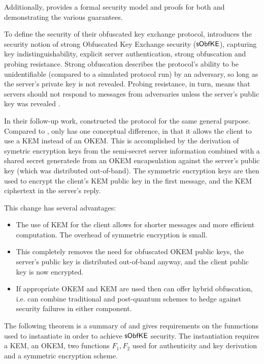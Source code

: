 Additionally, \cite{CCS:GunSteVei24} provides a formal security model and proofs for both \obfsfour{} and \pqobfs{} demonstrating the various guarantees.

To define the security of their obfuscated key exchange protocol, \cite{CCS:GunSteVei24} introduces the security notion of strong Obfuscated Key Exchange security ($\mathsf{sObfKE}$), capturing key indistinguishability, explicit server authentication, strong obfuscation and probing resistance. Strong obfuscation describes the protocol's ability to be unidentifiable (compared to a simulated protocol run) by an adversary, so long as the server's private key is not revealed. Probing resistance, in turn, means that servers should not respond to messages from adversaries unless the server's public key was revealed \cite[Section~4.1]{CCS:GunSteVei24}.

In their follow-up work, \cite{EPRINT:GRSV25} constructed the \drivel{} protocol for the same general purpose. Compared to \pqobfs{}, \drivel{} only has one conceptual difference, in that it allows the client to use a KEM instead of an OKEM.
This is accomplished by the derivation of symetric encryption keys from the semi-secret server information combined with a shared secret generatede from an OKEM encapsulation against the server's public key (which was distributed out-of-band).
The symmetric encryption keys are then used to encrypt the client's KEM public key in the first message, and the KEM ciphertext in the server's reply.

This change has several advantages:
\begin{itemize}
    \item The use of KEM for the client allows for shorter messages and more efficient computation. The overhead of symmetric encryption is small.
    \item This completely removes the need for obfuscated OKEM public keys, the server's public key is distributed out-of-band anyway, and the client public key is now encrypted.
    \item If appropriate OKEM and KEM are used then \drivel{} can offer hybrid obfuscation, i.e. \drivel{} can combine traditional and post-quantum schemes to hedge against security failures in either component.
\end{itemize}

The following theorem is a summary of \cite[Theorem~5]{EPRINT:GRSV25} and gives requirements on the funmctions used to instantiate \drivel{} in order to achieve $\mathsf{sObfKE}$ security. The instantiation requires a KEM, an OKEM, two functions $F_1, F_2$ used for authenticity and key derivation and a symmetric encryption scheme.

